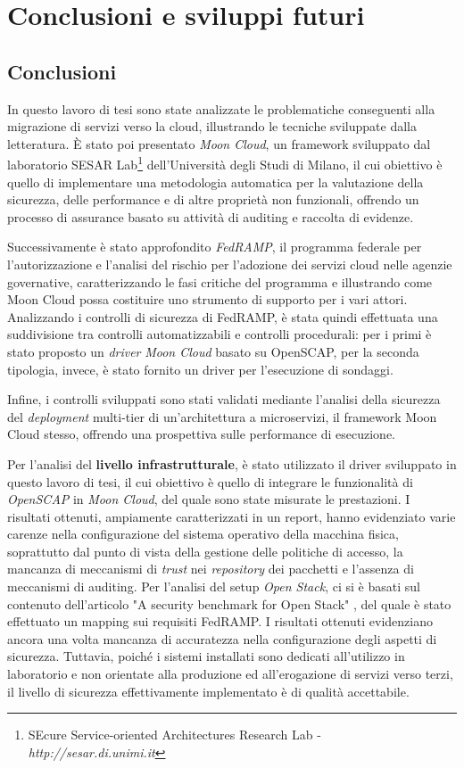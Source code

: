 \documentclass[../main.tex]{subfiles}
\begin{document}
\chapter{Conclusioni e sviluppi futuri}
\section {Conclusioni}
In questo lavoro di tesi sono state analizzate le problematiche conseguenti alla migrazione di servizi verso la cloud, illustrando le tecniche sviluppate dalla letteratura.
È stato poi presentato \textit{Moon Cloud}, un framework sviluppato dal laboratorio SESAR Lab\footnote{SEcure Service-oriented Architectures Research Lab - \textit{http://sesar.di.unimi.it}} dell'Università degli Studi di Milano, il cui obiettivo è quello di implementare una metodologia automatica per la valutazione della sicurezza, delle performance e di altre proprietà non funzionali, offrendo un processo di assurance basato su attività di auditing e raccolta di evidenze.

Successivamente è stato approfondito \textit{FedRAMP}, il programma federale per l'autorizzazione e l'analisi del rischio per l'adozione dei servizi cloud nelle agenzie governative, caratterizzando le fasi critiche del programma e illustrando come Moon Cloud possa costituire uno strumento di supporto per i vari attori.
Analizzando i controlli di sicurezza di FedRAMP, è stata quindi effettuata una suddivisione tra controlli automatizzabili e controlli procedurali: per i primi è stato proposto un \textit{driver} \textit{Moon Cloud} basato su OpenSCAP, per la seconda tipologia, invece, è stato fornito un driver per l'esecuzione di sondaggi.

Infine, i controlli sviluppati sono stati validati mediante l'analisi della sicurezza del \textit{deployment} multi-tier di un'architettura a microservizi, il framework Moon Cloud stesso, offrendo una prospettiva sulle performance di esecuzione.

Per l'analisi del \textbf{livello infrastrutturale}, è stato utilizzato il driver sviluppato in questo lavoro di tesi, il cui obiettivo è quello di integrare le funzionalità di \textit{OpenSCAP} in \textit{Moon Cloud}, del quale sono state misurate le prestazioni. I risultati ottenuti, ampiamente caratterizzati in un report, hanno evidenziato varie carenze nella configurazione del sistema operativo della macchina fisica, soprattutto dal punto di vista della gestione delle politiche di accesso, la mancanza di meccanismi di \textit{trust} nei \textit{repository} dei pacchetti e l'assenza di meccanismi di auditing.
Per l'analisi del setup \textit{Open Stack}, ci si è basati sul contenuto dell'articolo "A security benchmark for Open Stack" \cite{MyPaper}, del quale è stato effettuato un mapping sui requisiti FedRAMP. I risultati ottenuti evidenziano ancora una volta mancanza di accuratezza nella configurazione degli aspetti di sicurezza. Tuttavia, poiché i sistemi installati sono dedicati all'utilizzo in laboratorio e non orientate alla produzione ed all'erogazione di servizi verso terzi, il livello di sicurezza effettivamente implementato è di qualità accettabile.
\end{document}
